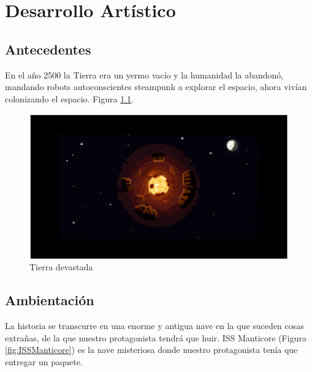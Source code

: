 

\chapter{Desarrollo Artístico}
\section{Antecedentes}
En el año 2500 la Tierra era un yermo vacío y la humanidad la abandonó, 
mandando robots autoconscientes steampunk a explorar el espacio, ahora vivían colonizando el espacio. Figura \ref{fig:TierraDevastada}.

\begin{figure}[H]
	\centering
	\includegraphics[scale=0.80]{imagenes/terraDevastada.png}
	\caption{\label{fig:TierraDevastada}Tierra devastada}
\end{figure}

\section{Ambientación}
La historia se transcurre en una enorme y antigua nave en la que suceden cosas extrañas, de la que nuestro protagonista tendrá que huir.
ISS Manticore (Figura \ref{fig:ISSManticore}) es la nave misteriosa donde nuestro protagonista tenía que entregar un paquete.  


